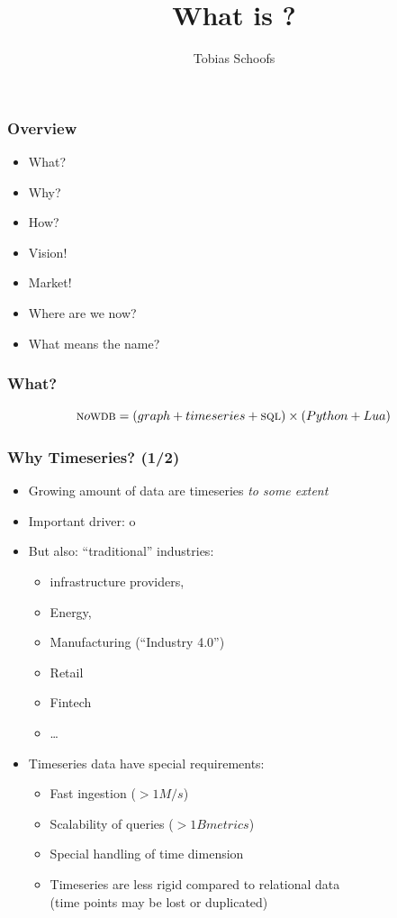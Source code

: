 \documentclass[mathserif,usenames,dvipsnames]{beamer}
\title{What is \nowdb?}
\author{Tobias Schoofs}
\begin{document}
\frame{\titlepage}

\begin{frame}
\frametitle{Overview}
\begin{itemize}
\item What?
\item Why?
\item How?
\item Vision!
\item Market!
\item Where are we now?
\item What means the name?
\end{itemize}
\end{frame}

\begin{frame}
\frametitle{What?}
\begin{equation*}
\textsc{n}o\textsc{wdb} = (graph +  timeseries + \textsc{sql}) \times (Python + Lua)
\end{equation*}
\end{frame}

\begin{frame}
\frametitle{Why Timeseries? (1/2)}
\begin{itemize}
\item Growing amount of data are timeseries \emph{to some extent}
\item Important driver: o
\item But also: ``traditional'' industries:
      \begin{itemize} 
      \item {} infrastructure providers,
      \item Energy,
      \item Manufacturing (``Industry 4.0'')
      \item Retail
      \item Fintech
      \item \dots
      \end{itemize}
\item Timeseries data have special requirements:
      \begin{itemize}
      \item Fast ingestion ($> 1M/s$)
      \item Scalability of queries ($> 1B metrics$)
      \item Special handling of time dimension
      \item Timeseries are less rigid compared to relational data\\
            (time points may be lost or duplicated)
      \end{itemize}
\end{itemize}
\end{frame}
\end{document}
